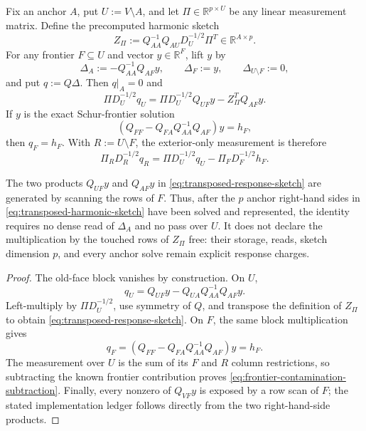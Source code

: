 \begin{lemma}
\label{lem:transposed-anchor-response-sketch}
Fix an anchor $A$, put $U:=V\setminus A$, and let
$\Pi\in\mathbb R^{p\times U}$ be any linear measurement matrix.  Define the
precomputed harmonic sketch
\begin{equation}
 Z_\Pi
 :=Q_{AA}^{-1}Q_{AU}D_U^{-1/2}\Pi^T
 \in\mathbb R^{A\times p}.
 \label{eq:transposed-harmonic-sketch}
\end{equation}
For any frontier $F\subseteq U$ and vector $y\in\mathbb R^F$, lift $y$ by
\begin{equation*}
 \Delta_A:=-Q_{AA}^{-1}Q_{AF}y,
 \qquad
 \Delta_F:=y,
 \qquad
 \Delta_{U\setminus F}:=0,
\end{equation*}
and put $q:=Q\Delta$.  Then $q|_A=0$ and
\begin{equation}
 \Pi D_U^{-1/2}q_U
 =\Pi D_U^{-1/2}Q_{UF}y-Z_\Pi^TQ_{AF}y.
 \label{eq:transposed-response-sketch}
\end{equation}
If $y$ is the exact Schur-frontier solution
\begin{equation*}
 \left(Q_{FF}-Q_{FA}Q_{AA}^{-1}Q_{AF}\right)y=h_F,
\end{equation*}
then $q_F=h_F$.  With $R:=U\setminus F$, the exterior-only measurement is
therefore
\begin{equation}
 \Pi_R D_R^{-1/2}q_R
 =\Pi D_U^{-1/2}q_U-\Pi_FD_F^{-1/2}h_F.
 \label{eq:frontier-contamination-subtraction}
\end{equation}

The two products $Q_{UF}y$ and $Q_{AF}y$ in
\cref{eq:transposed-response-sketch} are generated by scanning the rows of
$F$.  Thus, after the $p$ anchor right-hand sides in
\cref{eq:transposed-harmonic-sketch} have been solved and represented, the
identity requires no dense read of $\Delta_A$ and no pass over $U$.  It does
not declare the multiplication by the touched rows of $Z_\Pi$ free: their
storage, reads, sketch dimension $p$, and every anchor solve remain explicit
response charges.
\end{lemma}

\begin{proof}
The old-face block vanishes by construction.  On $U$,
\begin{equation*}
 q_U=Q_{UF}y-Q_{UA}Q_{AA}^{-1}Q_{AF}y.
\end{equation*}
Left-multiply by $\Pi D_U^{-1/2}$, use symmetry of $Q$, and transpose the
definition of $Z_\Pi$ to obtain
\cref{eq:transposed-response-sketch}.  On $F$, the same block multiplication
gives
\begin{equation*}
 q_F=\left(Q_{FF}-Q_{FA}Q_{AA}^{-1}Q_{AF}\right)y=h_F.
\end{equation*}
The measurement over $U$ is the sum of its $F$ and $R$ column restrictions,
so subtracting the known frontier contribution proves
\cref{eq:frontier-contamination-subtraction}.  Finally, every nonzero of
$Q_{VF}y$ is exposed by a row scan of $F$; the stated implementation ledger
follows directly from the two right-hand-side products.
\end{proof}

